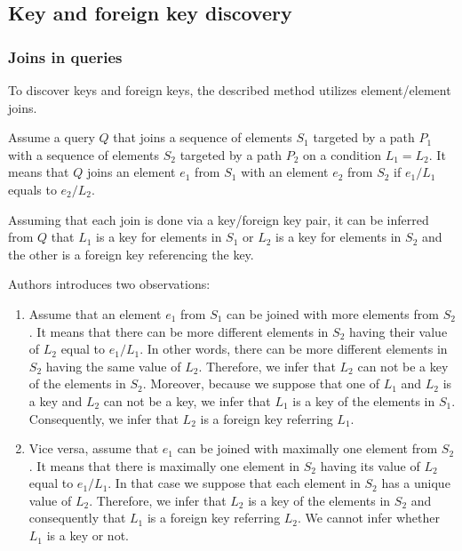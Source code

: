 \subsection{Key and foreign key discovery}
\subsubsection{Joins in queries}
To discover keys and foreign keys, the described method utilizes element/element joins.

Assume a query $Q$ that joins a sequence of elements $S_1$ targeted by a path $P_1$ with a sequence of elements $S_2$ targeted by a path $P_2$ on a condition $L_1 = L_2$. It means that $Q$ joins an element $e_1$ from $S_1$ with an element $e_2$ from $S_2$ if $e_1/L_1$ equals to $e_2/L_2$.


Assuming that each join is done via a key/foreign key pair, it can be inferred from $Q$ that $L_1$ is a key for elements in $S_1$ or $L_2$ is a key for elements in $S_2$ and the other is a foreign key referencing the key.

Authors introduces two observations:
\begin{enumerate}
\renewcommand{\theenumi}{(O\arabic{enumi})}
\renewcommand{\labelenumi}{\theenumi}
\item Assume that an element $e_1$ from $S_1$ can be joined with more elements from $S_2$. It means that there can be more different elements in $S_2$ having their value of $L_2$ equal to $e_1/L_1$. In other words, there can be more different elements in $S_2$ having the same value of $L_2$. Therefore, we infer that $L_2$ can not be a key of the elements in $S_2$. Moreover, because we suppose that one of $L_1$ and $L_2$ is a key and $L_2$ can not be a key, we infer that $L_1$ is a key of the elements in $S_1$. Consequently, we infer that $L_2$ is a foreign key referring $L_1$.
\item Vice versa, assume that $e_1$ can be joined with maximally one element from $S_2$. It means that there is maximally one element in $S_2$ having its value of $L_2$ equal to $e_1/L_1$. In that case we suppose that each element in $S_2$ has a unique value of $L_2$. Therefore, we infer that $L_2$ is a key of the elements in $S_2$ and consequently that $L_1$ is a foreign key referring $L_2$. We cannot infer whether $L_1$ is a key or not.
\end{enumerate}

